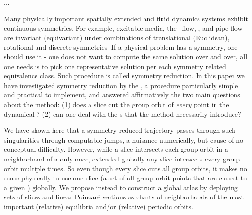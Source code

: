 

\ifboyscout
	...
\fi

Many physically important spatially extended and fluid dynamics systems
exhibit continuous symmetries. For example,  excitable
media, the \KS\
flow, {\pCf}, and
pipe flow\rf{Wk04,Kerswell05} are invariant (equivariant) under
combinations of translational (Euclidean), rotational and discrete
symmetries. If a physical problem has a symmetry, one should use it - one
does not want to compute the same solution over and over, all one needs
is to pick one representative solution per each symmetry related
equivalence class. Such procedure is called symmetry reduction.  In this
paper we have investigated symmetry reduction by the \mslices, a
procedure particularly simple and practical to implement, and answered
affirmatively the two main questions about the method:
(1) does a slice cut the group orbit of \emph{every} point in the dynamical \statesp?
(2) can one deal with the {\sset s} that the method necessarily
introduce?

We have shown here that a symmetry-reduced trajectory
passes through such singularities through computable jumps,
a nuisance numerically, but cause of no conceptual difficulty.
However, while a slice intersects each group orbit in a neighborhood of a
{\template} only once,
extended globally any slice intersects every group orbit multiple times.
So even though every slice cuts all group orbits, it makes no sense
physically to use one slice (a set of all group orbit points that are
closest to a given {\template}) globally. We propose instead to
construct a global atlas by
deploying sets of slices and linear Poincar\'e sections as charts of
neighborhoods of the most important (relative) equilibria and/or
(relative) periodic orbits.

